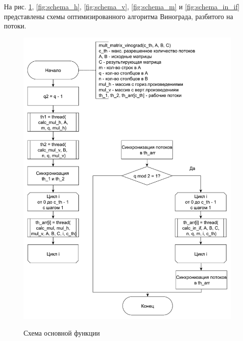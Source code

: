 \documentclass[a4paper,14pt]{article}
\begin{document}
	На рис. \ref{fig:schema_main}, \ref{fig:schema_h}, \ref{fig:schema_v}, \ref{fig:schema_m} и \ref{fig:schema_in_if} представлены схемы оптимизированного алгоритма Винограда, разбитого на потоки.
	    \begin{figure}[h!]
	    	\begin{center}
	    		{\includegraphics[scale = 0.5]{schema01.pdf}}
	    		\caption{Схема основной функции}
	    		\label{fig:schema_main}
	    	\end{center}
	    \end{figure}
	    
\end{document}
